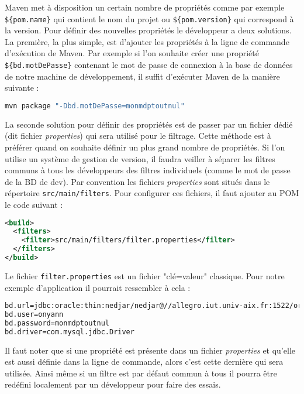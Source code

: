 \documentclass[a4paper,11pt]{article}
\begin{document}
Maven met à disposition un certain nombre de propriétés comme par exemple \texttt{\$\{pom.name\}} qui contient le nom 
du projet ou \texttt{\$\{pom.version\}} qui correspond à la version. Pour définir des nouvelles propriétés le développeur
a deux solutions. La première, la plus simple, est d'ajouter les propriétés à la ligne de commande d'exécution de Maven.
Par exemple si l'on souhaite créer une propriété \texttt{\$\{bd.motDePasse\}} contenant le mot de passe de connexion à 
la base de données de notre machine de développement, il suffit d'exécuter Maven de la manière suivante :
\begin{lstlisting}[language=sh]
mvn package "-Dbd.motDePasse=monmdptoutnul"
\end{lstlisting}
La seconde solution pour définir des propriétés est de passer par un fichier dédié (dit fichier \emph{properties}) qui 
sera utilisé pour le filtrage. Cette méthode est à préférer quand on souhaite définir un plus grand nombre de propriétés.
Si l'on utilise un système de gestion de version, il faudra veiller à séparer les filtres communs à tous les développeurs 
des filtres individuels (comme le mot de passe de la BD de dev). Par convention les fichiers \emph{properties} sont situés dans le répertoire 
\texttt{src/main/filters}. Pour configurer ces fichiers, il faut ajouter au POM le code suivant : 
\begin{lstlisting}[language=XML]
<build>
  <filters>
    <filter>src/main/filters/filter.properties</filter>
  </filters>
</build>
\end{lstlisting}
Le fichier \texttt{filter.properties} est un fichier "clé=valeur" classique. Pour notre exemple d'application il 
pourrait ressembler à cela : 
\begin{lstlisting}[language=XML]
bd.url=jdbc:oracle:thin:nedjar/nedjar@//allegro.iut.univ-aix.fr:1522/orcl.iut.univ-aix.fr
bd.user=onyann
bd.password=monmdptoutnul
bd.driver=com.mysql.jdbc.Driver
\end{lstlisting}
Il faut noter que si une propriété est présente dans un fichier \emph{properties} et 
qu'elle est aussi définie dans la ligne de commande, alors c'est cette dernière qui sera utilisée. Ainsi même si un filtre
est par défaut commun à tous il pourra être redéfini localement par un développeur pour faire des essais.
\end{document}
